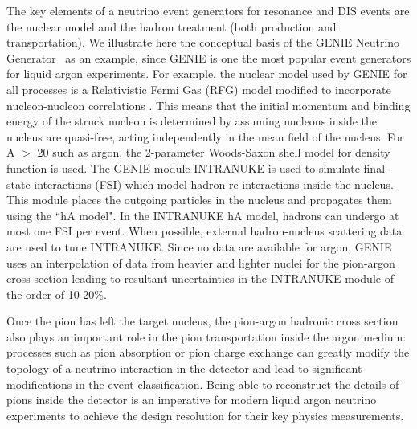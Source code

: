 


The key elements of a neutrino event generators for resonance and DIS events are the nuclear model and the hadron treatment (both production and transportation).  We illustrate here the conceptual basis of the GENIE Neutrino Generator~\cite{Andreopoulos:2009rq} as an example, since GENIE is one the most popular event generators for liquid argon experiments.
For example, the nuclear model used by GENIE for all processes is a Relativistic Fermi Gas (RFG) model modified to incorporate nucleon-nucleon correlations \cite{PhysRevD.24.1400}. This means that the initial momentum and binding energy of the struck nucleon is determined by assuming nucleons inside the nucleus are quasi-free, acting independently in the mean field of the nucleus. For A $ >$ 20 such as argon, the 2-parameter Woods-Saxon shell model for density function is used.  The GENIE module INTRANUKE \cite{Juszczak2006} is used to simulate final-state interactions (FSI) which model  hadron re-interactions inside the nucleus. This module places the outgoing particles in the nucleus and propagates them using the ``hA model".  In the INTRANUKE hA model, hadrons can undergo at most one FSI per event. When possible, external hadron-nucleus scattering data are used to tune INTRANUKE. Since no data are available for argon, GENIE uses an interpolation of data from heavier and lighter nuclei for the pion-argon cross section leading to resultant uncertainties in the INTRANUKE module of the order of 10-20\%.
 
Once the pion has left the target nucleus, the pion-argon hadronic cross section also plays an important role in the pion transportation inside the argon medium: processes such as pion absorption or pion charge exchange can greatly modify the topology of a neutrino interaction	 in the detector and lead to significant modifications in the event classification.
Being able to reconstruct the details of pions inside the detector is an imperative for modern liquid argon neutrino experiments to achieve the design resolution for their key physics measurements.


